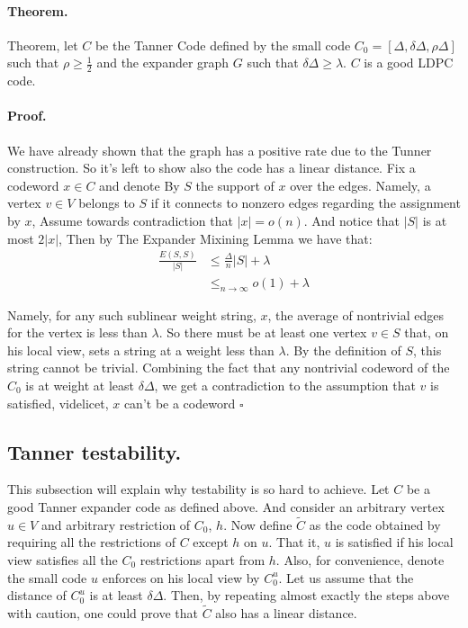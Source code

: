 \documentclass[sigplan,screen]{acmart}
\begin{document}
\begin{multicols*}{2}
  \paragraph{Theorem.} Theorem, let $C$ be the Tanner Code defined by the small code $C_{0} = [\Delta,\delta\Delta, \rho\Delta ]$ such that $\rho \ge \frac{1}{2}$ and the expander graph $G$ such that $\delta\Delta \ge \lambda$. $C$ is a good  LDPC code.
  \paragraph{Proof.} We have already shown that the graph has a positive rate due to the Tunner construction. So it's left to show also the code has a linear distance. Fix a codeword $x \in C$ and denote By $S$ the support of $x$ over the edges. Namely, a vertex $v\in V$ belongs to $S$ if it connects to nonzero edges regarding the assignment by $x$, Assume towards contradiction that $|x| = o\left( n \right)$. And notice that $|S|$ is at most $2|x|$, Then by The Expander Mixining Lemma we have that: 
  \begin{equation*}
    \begin{split}
      \frac{E\left( S,S \right)}{|S|} & \le \frac{\Delta}{n}|S|  + \lambda \\
      & \le_{ n \rightarrow \infty} o\left( 1 \right) + \lambda
    \end{split}
  \end{equation*}

  Namely, for any such sublinear weight string, $x$, the average of nontrivial edges for the vertex is less than $\lambda$. So there must be at least one vertex $v \in S$ that, on his local view, sets a  string at a weight less than $\lambda$. By the definition of $S$, this string cannot be trivial. Combining the fact that any nontrivial codeword of the $C_{0}$ is at weight at least $\delta\Delta$, we get a contradiction to the assumption that $v$ is satisfied, videlicet, $x$ can't be a codeword $\square$
  \subsection{Tanner testability.} This subsection will explain why testability is so hard to achieve. Let $C$ be a good Tanner expander code as defined above. And consider an arbitrary vertex $u \in V$ and arbitrary restriction of $C_{0}$, $h$. Now define $\tilde{C}$ as the code obtained by requiring all the restrictions of $C$ except $h$ on $u$. That it, $u$ is satisfied if his local view satisfies all the $C_{0}$ restrictions apart from $h$.
  Also, for convenience, denote the small code $u$ enforces on his local view by $C_{0}^{u}$. Let us assume that the distance of $C_{0}^{u}$ is at least $\delta\Delta$. 
  Then, by repeating almost exactly the steps above with caution, one could prove that $\tilde{C}$ also has a linear distance. 



\end{multicols*}
\end{document}
